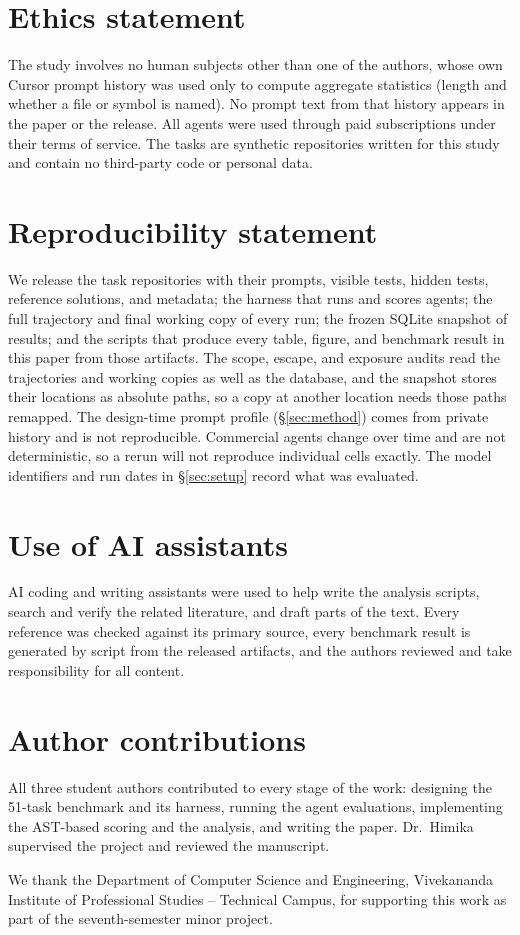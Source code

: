 \section*{Ethics statement}

The study involves no human subjects other than one of the authors, whose own
Cursor prompt history was used only to compute aggregate statistics (length
and whether a file or symbol is named). No prompt text from that history
appears in the paper or the release. All agents were used through paid
subscriptions under their terms of service. The tasks are synthetic
repositories written for this study and contain no third-party code or
personal data.

\section*{Reproducibility statement}

We release the task repositories with their prompts, visible tests, hidden
tests, reference solutions, and metadata; the harness that runs and scores
agents; the full trajectory and final working copy of every run; the frozen
SQLite snapshot of results; and the scripts that produce every table, figure,
and benchmark result in this paper from those artifacts. The scope, escape,
and exposure audits read the trajectories and working copies as well as the
database, and the snapshot stores their locations as absolute paths, so a
copy at another location needs those paths remapped. The design-time prompt
profile (\S\ref{sec:method}) comes from private history and is not
reproducible. Commercial agents change over time and are not
deterministic, so a rerun will not reproduce individual cells exactly. The
model identifiers and run dates in \S\ref{sec:setup} record what was
evaluated.

\section*{Use of AI assistants}

AI coding and writing assistants were used to help write the analysis
scripts, search and verify the related literature, and draft parts of the
text. Every reference was checked against its primary source, every benchmark
result is generated by script from the released artifacts, and the authors
reviewed and take responsibility for all content.

\section*{Author contributions}

All three student authors contributed to every stage of the work: designing
the 51-task benchmark and its harness, running the agent evaluations,
implementing the AST-based scoring and the analysis, and writing the paper.
Dr.~Himika supervised the project and reviewed the manuscript.

\begin{acks}
We thank the Department of Computer Science and Engineering, Vivekananda
Institute of Professional Studies -- Technical Campus, for supporting this
work as part of the seventh-semester minor project.
\end{acks}
